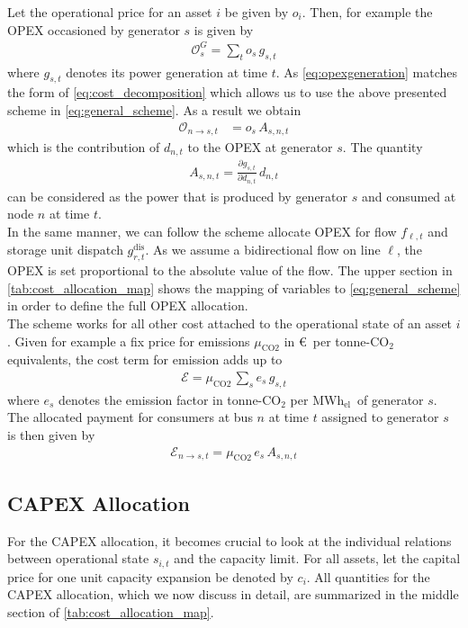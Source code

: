 \documentclass[11pt,twocolumn]{article}
\newcommand{\pdv}[2]{\frac{\partial #1}{\partial #2}}
\newcommand{\state}{s_{i,t}}
\newcommand{\generation}{g_{s,t}}
\newcommand{\operationalpricegeneration}{o_{s}}
\newcommand{\flow}{f_{\ell,t}}
\newcommand{\storage}{g_{r,t}}
\newcommand{\storagedispatch}{\storage^\text{dis}}
\newcommand{\demand}[1][n]{d_{#1,t}}
\newcommand{\emission}{e_{s}}
\newcommand{\emissionprice}{\mu_{\text{CO2}}}
\newcommand{\megawatthour}{MWh$_\text{el}$}
\newcommand{\opex}{\mathcal{O}}
\newcommand{\opexgeneration}{\mathcal{O}^G}
\newcommand{\emissioncost}{\mathcal{E}}
\newcommand{\allocategeneration}[1][s, n]{A_{#1,t}}
\newcommand{\allocateopex}[1][n \rightarrow s]{\opex_{#1,t}}
\newcommand{\allocateemissioncost}[1][n \rightarrow s]{\emissioncost_{#1,t}}
\begin{document}
Let the operational price for an asset $i$ be given by $o_i$. Then, for example the OPEX occasioned by generator $s$ is given by 
\begin{align}
    \opexgeneration_s = \sum_t \operationalpricegeneration \, \generation 
    \label{eq:opexgeneration}
\end{align}
where $\generation$ denotes its power generation at time $t$. As \cref{eq:opexgeneration} matches the form of \cref{eq:cost_decomposition} which allows us to use the above presented scheme in \cref{eq:general_scheme}. As a result we obtain 
\begin{align}
    \allocateopex[n \rightarrow s] &= 
   \operationalpricegeneration \,  \allocategeneration
\label{eq:allocate_opexGeneration_detailed}
\end{align}
which is the contribution of $\demand$ to the OPEX at generator $s$.
The quantity  
\begin{align}
 \allocategeneration = \pdv{\generation}{\demand} \, \demand
 \label{eq:allocate_peer}
\end{align}
can be considered as the power that is produced by generator $s$ and consumed at node $n$ at time $t$. \\
In the same manner, we can follow the scheme allocate OPEX for flow $\flow$ and storage unit dispatch $\storagedispatch$. As we assume a bidirectional flow on line $\ell$, the OPEX is set proportional to the absolute value of the flow. The upper section in \cref{tab:cost_allocation_map} shows the mapping of variables to \cref{eq:general_scheme} in order to define the full OPEX allocation. \\

The scheme works for all other cost attached to the operational state of an asset $i$. Given for example a fix price for emissions $\emissionprice$ in \euro\, per tonne-CO$_2$ equivalents, the cost term for emission adds up to 
\begin{align}
 \emissioncost = \emissionprice \, \sum_s  \emission \, \generation
\end{align}
where $\emission$ denotes the emission factor in tonne-CO$_2$ per \megawatthour\, of generator $s$.
The allocated payment for consumers at bus $n$ at time $t$ assigned to generator $s$ is then given by 
\begin{align}
 \allocateemissioncost = \emissionprice \, \emission \, \allocategeneration
\end{align}


\subsection{CAPEX Allocation}
For the CAPEX allocation, it becomes crucial to look at the individual relations between operational state $\state$ and the capacity limit. For all assets, let the capital price for one unit capacity expansion be denoted by $c_i$.  All quantities for the CAPEX allocation, which we now discuss in detail, are summarized in the middle section of \cref{tab:cost_allocation_map}.  
\end{document}
